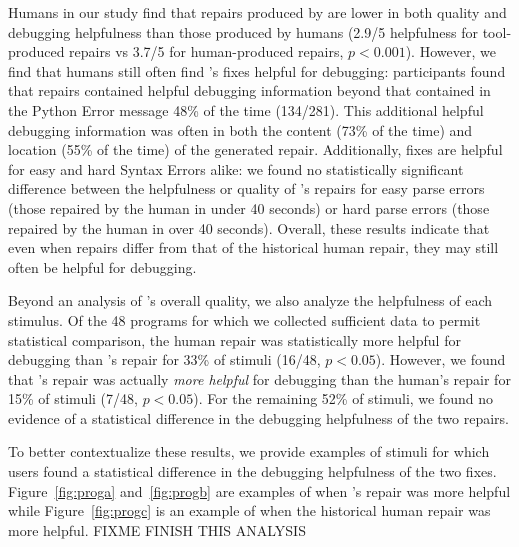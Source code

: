  Humans in our study find that repairs produced by
\toolname are lower in both quality and debugging helpfulness than those produced 
by humans (2.9/5 helpfulness for tool-produced repairs vs 3.7/5 for human-produced 
repairs, $p < 0.001$). However, we find that humans still often find \toolname's fixes 
helpful for debugging: participants found that \toolname repairs contained helpful 
debugging information beyond that contained in the Python Error message 48\% of 
the time (134/281). This additional helpful debugging information was often in both
the content (73\% of the time) and location (55\% of the time) of the generated 
repair. Additionally, \toolname fixes are helpful for easy and hard Syntax Errors 
alike: we found no statistically significant difference between the helpfulness or
quality of \toolname's repairs for easy parse errors (those repaired by the human in under 
40 seconds) or hard parse errors (those repaired by the human in over 40 seconds). %
Overall, these results indicate that even when \toolname repairs differ from 
that of the historical human repair, they may still often be helpful for debugging. 

 Beyond an analysis of \toolname's overall quality, we also 
analyze the helpfulness of each stimulus. %
Of the 48 programs for which we collected sufficient data to permit statistical 
comparison, the human repair was statistically more helpful for debugging than \toolname's
repair for 33\% of stimuli (16/48, $p<0.05$). However, we found that \toolname's
repair was actually \emph{more helpful} for debugging than the human's repair for 15\% of
stimuli (7/48, $p<0.05$). For the remaining 52\% of stimuli, we found no evidence of a 
statistical difference in the debugging helpfulness of the two repairs.

To better contextualize these results, we provide examples of stimuli for which users found a
statistical difference in the debugging helpfulness of the two fixes. 
Figure~\ref{fig:proga} and~\ref{fig:progb} are examples of when \toolname's repair was more
helpful while Figure~\ref{fig:progc} is an example of when the historical human repair was
more helpful. FIXME FINISH THIS ANALYSIS

